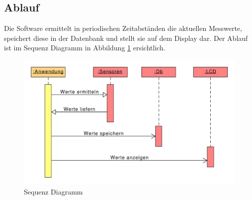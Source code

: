 \documentclass[
    10pt,
    a4paper,
]{scrartcl}
\begin{document}
\subsection{Ablauf}

Die Software ermittelt in periodischen Zeitabständen die aktuellen Messwerte, speichert
diese in der Datenbank und stellt sie auf dem Display dar. Der Ablauf ist im Sequenz
Diagramm in Abbildung \ref{fig:sequence-diagram} ersichtlich.

\begin{figure}[ht]
    \centering
    \includegraphics[width=\textwidth]{sequence-diagram}
    \caption{Sequenz Diagramm}
    \label{fig:sequence-diagram}
\end{figure}






\end{document}
